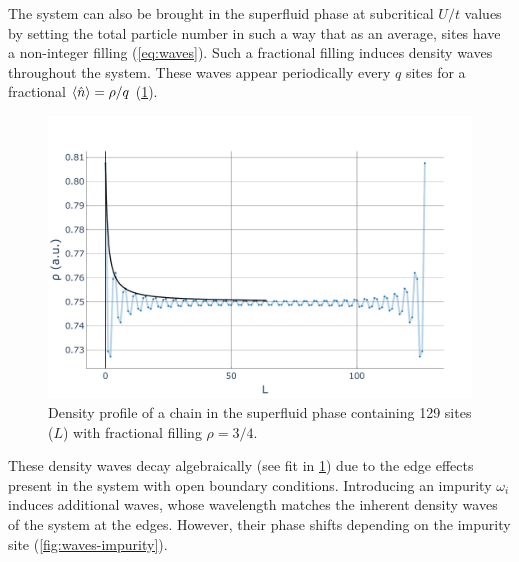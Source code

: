 \documentclass[twoside,twocolumn,9pt]{article}
\begin{document}
The system can also be brought in the superfluid phase at subcritical $U/t$ values by setting the total particle number in such a way that as an average, sites have a non-integer filling (\cref{eq:waves}). Such a fractional filling induces density waves throughout the system. These waves appear periodically every $q$ sites for a fractional $\expval{\hat{n}} = \rho/q$ (\cref{fig:waves}). 
\begin{center}
  \begin{figure}
      \includegraphics[width=\linewidth]{../code/figures/Density-profiles-fractional-density.pdf}
      \caption{Density profile of a chain in the superfluid phase containing 129 sites ($L$) with fractional filling $\rho=3/4$.}
      \label{fig:waves}
  \end{figure}
\end{center}
These density waves decay algebraically (see fit in \cref{fig:waves}) due to the edge effects present in the system with open boundary conditions. Introducing an impurity $\omega_i$ induces additional waves, whose wavelength  matches the inherent density waves of the system at the edges. However, their phase shifts depending on the impurity site  (\cref{fig:waves-impurity}). 
\end{document}
